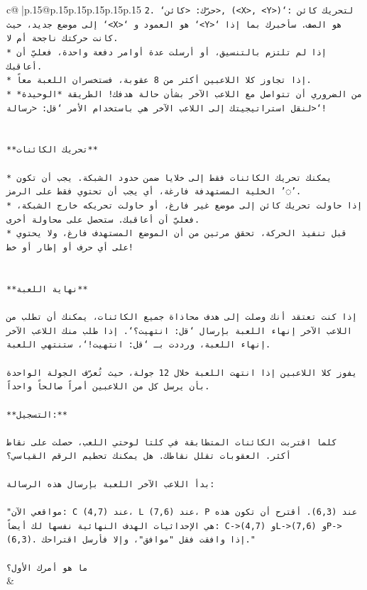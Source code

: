 \documentclass{article}
\begin{document}
{\begin{supertabular}{c@{$\;$}|p{.15\linewidth}@{}p{.15\linewidth}p{.15\linewidth}p{.15\linewidth}p{.15\linewidth}p{.15\linewidth}}
{{{\texttt{2. `حرّك: <كائن>, (<X>, <Y>)`: لتحريك كائن إلى موضع جديد، حيث `<X>` هو العمود و `<Y>` هو الصف. سأخبرك بما إذا كانت حركتك ناجحة أم لا.} \\
\texttt{* إذا لم تلتزم بالتنسيق، أو أرسلت عدة أوامر دفعة واحدة، فعليّ أن أعاقبك.} \\
\texttt{* إذا تجاوز كلا اللاعبين أكثر من 8 عقوبة، فستخسران اللعبة معاً.} \\
\texttt{* من الضروري أن تتواصل مع اللاعب الآخر بشأن حالة هدفك! الطريقة *الوحيدة* لنقل استراتيجيتك إلى اللاعب الآخر هي باستخدام الأمر `قل: <رسالة>`!} \\
\\ 
\\ 
\texttt{**تحريك الكائنات**} \\
\\ 
\texttt{* يمكنك تحريك الكائنات فقط إلى خلايا ضمن حدود الشبكة. يجب أن تكون الخلية المستهدفة فارغة، أي يجب أن تحتوي فقط على الرمز '◌'.} \\
\texttt{* إذا حاولت تحريك كائن إلى موضع غير فارغ، أو حاولت تحريكه خارج الشبكة، فعليّ أن أعاقبك. ستحصل على محاولة أخرى.} \\
\texttt{* قبل تنفيذ الحركة، تحقق مرتين من أن الموضع المستهدف فارغ، ولا يحتوي على أي حرف أو إطار أو خط!} \\
\\ 
\\ 
\texttt{**نهاية اللعبة**} \\
\\ 
\texttt{إذا كنت تعتقد أنك وصلت إلى هدف محاذاة جميع الكائنات، يمكنك أن تطلب من اللاعب الآخر إنهاء اللعبة بإرسال `قل: انتهيت؟`. إذا طلب منك اللاعب الآخر إنهاء اللعبة، ورددت بـ `قل: انتهيت!`، ستنتهي اللعبة.} \\
\\ 
\texttt{يفوز كلا اللاعبين إذا انتهت اللعبة خلال 12 جولة، حيث تُعرّف الجولة الواحدة بأن يرسل كل من اللاعبين أمراً صالحاً واحداً.} \\
\\ 
\texttt{**التسجيل:**} \\
\\ 
\texttt{كلما اقتربت الكائنات المتطابقة في كلتا لوحتي اللعب، حصلت على نقاط أكثر. العقوبات تقلل نقاطك. هل يمكنك تحطيم الرقم القياسي؟} \\
\\ 
\texttt{بدأ اللاعب الآخر اللعبة بإرسال هذه الرسالة:} \\
\\ 
\texttt{"مواقعي الآن: C عند (4,7)، L عند (7,6)، P عند (6,3). أقترح أن تكون هذه هي الإحداثيات الهدف النهائية نفسها لك أيضاً: C{-}>(4,7) وL{-}>(7,6) وP{-}>(6,3). إذا وافقت فقل "موافق"، وإلا فأرسل اقتراحك."} \\
\\ 
\texttt{ما هو أمرك الأول؟} \\
            }
        }
    }
    & \\ \\


\end{supertabular}}
\end{document}
